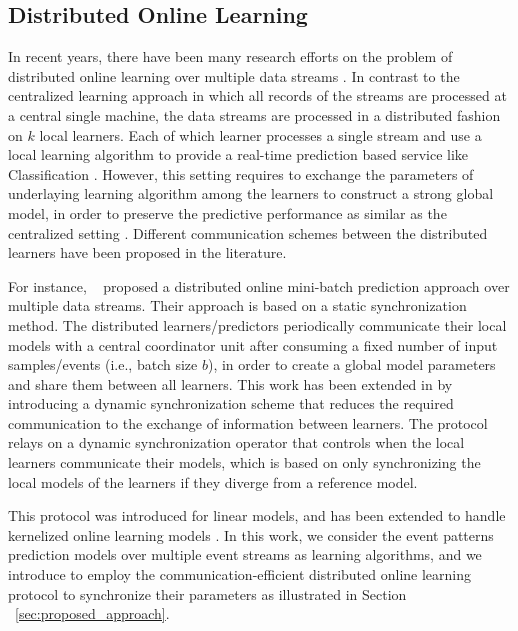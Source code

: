 
\subsection{Distributed Online Learning}

\par In recent years, there have been many research efforts on the problem of distributed online learning over multiple data streams \cite{tekin2014distributed,yan2013distributed,canzian2015ensemble,zhang2014fast,dekel2012optimal,kamp2014communication}.   In contrast to the centralized learning approach in which all records of the streams are processed at a central single machine, the data streams are processed in a distributed fashion on $k$ local learners. Each of which learner processes a single stream and use a local learning algorithm to provide a real-time prediction based service like Classification \cite{canzian2015ensemble}.  However, this setting requires to exchange the parameters of underlaying learning algorithm among the learners to construct a strong global model, in order to preserve the predictive performance as similar as  the centralized setting \cite{kamp2014communication}. Different communication schemes between the distributed learners have been proposed in the literature. 

\par For instance, ~\citet{dekel2012optimal} proposed a distributed online mini-batch prediction approach over multiple data streams. Their approach is based on a static synchronization method. The distributed learners/predictors periodically communicate  their local models with a central coordinator unit after consuming a fixed number of input samples/events (i.e., batch size $b$), in order to  create a global model parameters and share them between all learners. This work has been extended in \cite{kamp2014communication} by introducing  a dynamic synchronization scheme that reduces the required communication to the exchange of information between learners. The protocol  relays on a dynamic synchronization operator that controls when the local learners communicate their models, which is based on only synchronizing the local models of the learners if they diverge from a reference model. 
 
\par This protocol was introduced for linear models, and has been extended to handle kernelized online learning models \cite{kamp2016communication}. In this work, we consider the event patterns prediction models over multiple event streams as learning algorithms, and we introduce to employ the communication-efficient distributed online learning protocol \cite{kamp2014communication} to synchronize their parameters as illustrated in Section ~\ref{sec:proposed_approach}. 
